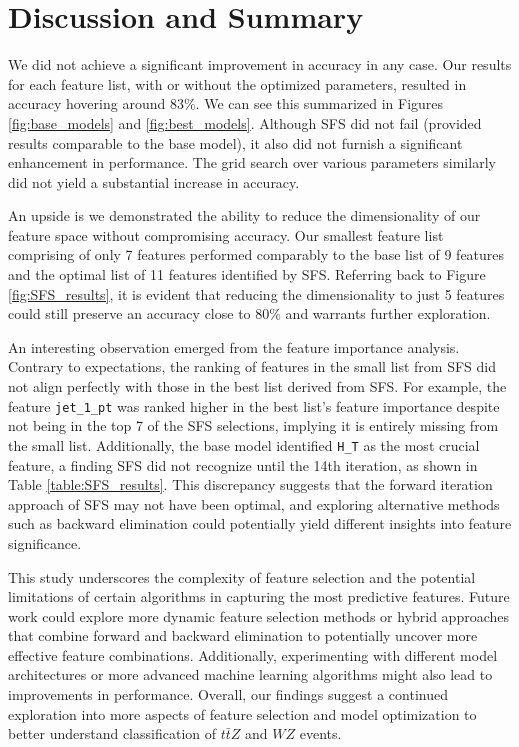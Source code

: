\documentclass[]{article}
\begin{document}
\clearpage
\section{Discussion and Summary}

We did not achieve a significant improvement in accuracy in any case. Our results for each feature list, with or without the optimized parameters, resulted in accuracy hovering around $83\%$. We can see this summarized in Figures \ref{fig:base_models} and \ref{fig:best_models}.  Although SFS did not fail (provided results comparable to the base model), it also did not furnish a significant enhancement in performance. The grid search over various parameters similarly did not yield a substantial increase in accuracy.

An upside is we demonstrated the ability to reduce the dimensionality of our feature space without compromising accuracy. Our smallest feature list comprising of only 7 features performed comparably to the base list of 9 features and the optimal list of 11 features identified by SFS. Referring back to Figure \ref{fig:SFS_results}, it is evident that reducing the dimensionality to just 5 features could still preserve an accuracy close to $80\%$ and warrants further exploration.

An interesting observation emerged from the feature importance analysis. Contrary to expectations, the ranking of features in the small list from SFS did not align perfectly with those in the best list derived from SFS. For example, the feature \texttt{jet\_1\_pt} was ranked higher in the best list's feature importance despite not being in the top 7 of the SFS selections, implying it is entirely missing from the small list. Additionally, the base model identified \texttt{H\_T} as the most crucial feature, a finding SFS did not recognize until the 14th iteration, as shown in Table \ref{table:SFS_results}. This discrepancy suggests that the forward iteration approach of SFS may not have been optimal, and exploring alternative methods such as backward elimination could potentially yield different insights into feature significance.

This study underscores the complexity of feature selection and the potential limitations of certain algorithms in capturing the most predictive features. Future work could explore more dynamic feature selection methods or hybrid approaches that combine forward and backward elimination to potentially uncover more effective feature combinations. Additionally, experimenting with different model architectures or more advanced machine learning algorithms might also lead to improvements in performance. Overall, our findings suggest a continued exploration into more aspects of feature selection and model optimization to better understand classification of $t\bar{t}Z$ and $WZ$ events.
\end{document}
